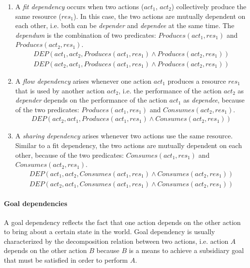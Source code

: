 \begin{enumerate}
	\item A \emph{fit dependency} occurs when two actions ($act_1$, $act_2$) collectively produce the same resource ($res_1$). In this case, the two actions  are mutually dependent on each other, i.e. both can be \emph{depender} and \emph{dependee} at the same time. The \emph{dependum} is the combination of two predicates: $Produces(act_1, res_1)$ and $Produces(act_2, res_1)$.
		\begin{align*} 
			 DEP(act_1, act_2, Produces(act_1, res_1) \land Produces(act_2, res_1))\\
			 DEP(act_2, act_1, Produces(act_1, res_1) \land Produces(act_2, res_1))
		\end{align*}
	\item A \emph{flow dependency} arises whenever one action $act_1$ produces a resource $res_1$ that is used by another action $act_2$, i.e. the performance of the action $act_2$ as \emph{depender} depends on the performance of the action $act_1$ as \emph{dependee}, because of the two predicates: $Produces(act_1, res_1)$ and $Consumes(act_2, res_1)$.
		\begin{align*} 
			 DEP(act_2, act_1, Produces(act_1, res_1) \land Consumes(act_2, res_1))
		\end{align*}
	\item A \emph{sharing dependency} arises whenever two actions use the same resource. Similar to a fit dependency, the two actions are mutually dependent on each other, because of the two predicates: $Consumes(act_1, res_1)$ and $Consumes(act_2, res_1)$.
	\begin{align*} 
		 DEP(act_1, act_2, Consumes(act_1, res_1) \land Consumes(act_2, res_1))\\
		 DEP(act_2, act_1, Consumes(act_1, res_1) \land Consumes(act_2, res_1))
	\end{align*}
\end{enumerate}

\paragraph*{Goal dependencies} %
\label{par:goal_dependencies}
A goal dependency reflects the fact that one action depends on the other action to bring about a certain state in the world. Goal dependency is usually characterized by the decomposition relation between two actions, i.e. action $A$ depends on the other action $B$ because $B$ is a means to achieve a subsidiary goal that must be satisfied in order to perform $A$.

